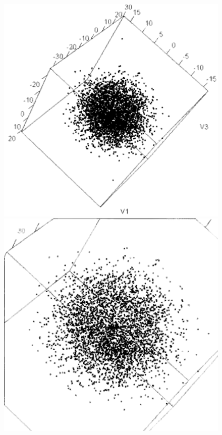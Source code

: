 \documentclass[
  letterpaper,
  10pt,
  krantz2]{krantz}
\begin{document}
\begin{figure}

\begin{minipage}{0.50\linewidth}
\includegraphics{images/pollen-eureka1.png}\end{minipage}%
%
\begin{minipage}{0.50\linewidth}
\includegraphics{images/pollen-eureka2.png}\end{minipage}%

\end{figure}
\end{document}
